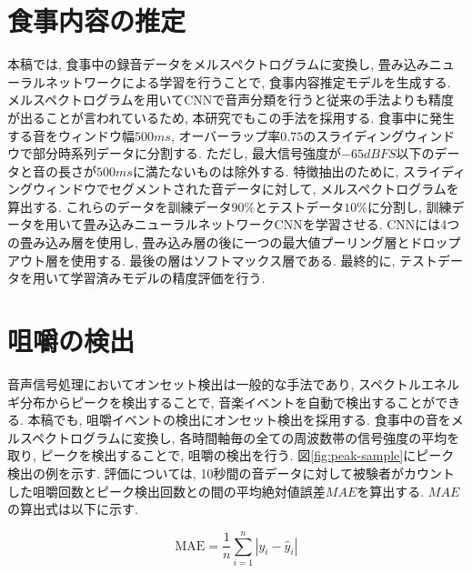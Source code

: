 \section{食事内容の推定}

本稿では, 食事中の録音データをメルスペクトログラムに変換し, 畳み込みニューラルネットワークによる学習を行うことで, 食事内容推定モデルを生成する. メルスペクトログラムを用いてCNNで音声分類を行うと従来の手法よりも精度が出ることが言われているため\cite{Dossou_2021_ICCV}, 本研究でもこの手法を採用する.
食事中に発生する音をウィンドウ幅$500ms$, オーバーラップ率$0.75$のスライディングウィンドウで部分時系列データに分割する. ただし, 最大信号強度が$-65dBFS$以下のデータと音の長さが$500ms$に満たないものは除外する. 特徴抽出のために, スライディングウィンドウでセグメントされた音データに対して, メルスペクトログラムを算出する. これらのデータを訓練データ$90\%$とテストデータ$10\%$に分割し, 訓練データを用いて畳み込みニューラルネットワークCNNを学習させる. CNNには4つの畳み込み層を使用し, 畳み込み層の後に一つの最大値プーリング層とドロップアウト層を使用する. 最後の層はソフトマックス層である. 最終的に, テストデータを用いて学習済みモデルの精度評価を行う.

\section{咀嚼の検出}

音声信号処理においてオンセット検出は一般的な手法であり, スペクトルエネルギ分布からピークを検出することで, 音楽イベントを自動で検出することができる. 本稿でも, 咀嚼イベントの検出にオンセット検出を採用する. 食事中の音をメルスペクトログラムに変換し, 各時間軸毎の全ての周波数帯の信号強度の平均を取り, ピークを検出することで, 咀嚼の検出を行う. 図\ref{fig:peak-sample}にピーク検出の例を示す. 評価については, 10秒間の音データに対して被験者がカウントした咀嚼回数とピーク検出回数との間の平均絶対値誤差$MAE$を算出する. $MAE$の算出式は以下に示す.

\begin{equation}
    \text{MAE} = \frac{1}{n} \sum_{i=1}^{n} | y_i - \hat{y}_i |
\end{equation}

